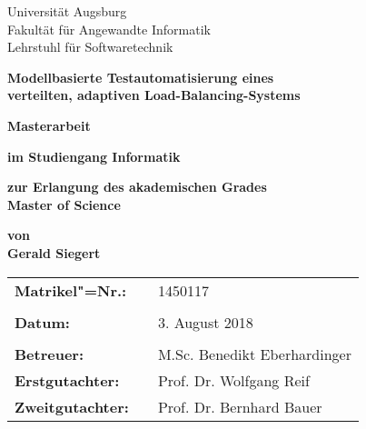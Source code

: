 \begin{center}
    {\Large{Universität Augsburg\\
            Fakultät für Angewandte Informatik\\
            Lehrstuhl für Softwaretechnik}}
    \vspace{3\baselineskip}
    
    \begin{onehalfspace}
        \textbf{\large{Modellbasierte Testautomatisierung eines\\verteilten, adaptiven Load-Balancing-Systems}}
    \end{onehalfspace}
    \vspace{3\baselineskip}
    
    \textbf{{\Large{Masterarbeit}}}
    \vspace{1\baselineskip}
    
    \textbf{im Studiengang Informatik}
    \vspace{1\baselineskip}
    
    \textbf{zur Erlangung des akademischen Grades\\Master of Science}
    \vspace{1\baselineskip}
    
    \textbf{von\\Gerald Siegert}
    \vfill
    
    \begin{singlespace}
        \begin{tabular}{lll}
        	\textbf{Matrikel"=Nr.:}  &  & 1450117                      \\
        	                         &  &                              \\
        	\textbf{Datum:}          &  & 3. August 2018               \\
        	                         &  &                              \\
        	\textbf{Betreuer:}       &  & M.Sc. Benedikt Eberhardinger \\
        	\textbf{Erstgutachter:}  &  & Prof. Dr. Wolfgang Reif      \\
        	\textbf{Zweitgutachter:} &  & Prof. Dr. Bernhard Bauer
        \end{tabular}
    \end{singlespace}
\end{center}
